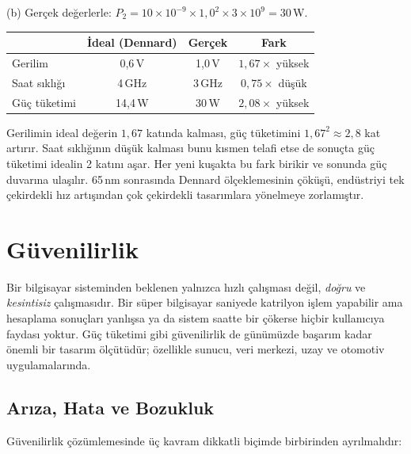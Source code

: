 \begin{ornek}[1.6]
(b) Gerçek değerlerle: $P_2 = 10 \times 10^{-9} \times 1{,}0^2 \times 3 \times 10^{9} = 30$\,W.

\begin{center}
\small
\begin{tabular}{lccc}
\toprule
& \textbf{İdeal (Dennard)} & \textbf{Gerçek} & \textbf{Fark} \\
\midrule
Gerilim & 0{,}6\,V & 1{,}0\,V & $1{,}67\times$ yüksek \\
Saat sıklığı & 4\,GHz & 3\,GHz & $0{,}75\times$ düşük \\
Güç tüketimi & 14{,}4\,W & 30\,W & $2{,}08\times$ yüksek \\
\bottomrule
\end{tabular}
\end{center}

Gerilimin ideal değerin $1{,}67$ katında kalması, güç tüketimini $1{,}67^2 \approx 2{,}8$ kat artırır. Saat sıklığının düşük kalması bunu kısmen telafi etse de sonuçta güç tüketimi idealin 2 katını aşar. Her yeni kuşakta bu fark birikir ve sonunda güç duvarına ulaşılır. 65\,nm sonrasında Dennard ölçeklemesinin çöküşü, endüstriyi tek çekirdekli hız artışından çok çekirdekli tasarımlara yönelmeye zorlamıştır.
\end{ornek}

\section{Güvenilirlik}
\label{sec:guvenilirlik}

Bir bilgisayar sisteminden beklenen yalnızca hızlı çalışması değil, \emph{doğru} ve \emph{kesintisiz} çalışmasıdır. Bir süper bilgisayar saniyede katrilyon işlem yapabilir ama hesaplama sonuçları yanlışsa ya da sistem saatte bir çökerse hiçbir kullanıcıya faydası yoktur. Güç tüketimi gibi güvenilirlik de günümüzde başarım kadar önemli bir tasarım ölçütüdür; özellikle sunucu, veri merkezi, uzay ve otomotiv uygulamalarında.

\subsection{Arıza, Hata ve Bozukluk}
\label{subsec:ariza-hata-bozukluk}

Güvenilirlik çözümlemesinde üç kavram dikkatli biçimde birbirinden ayrılmalıdır:

